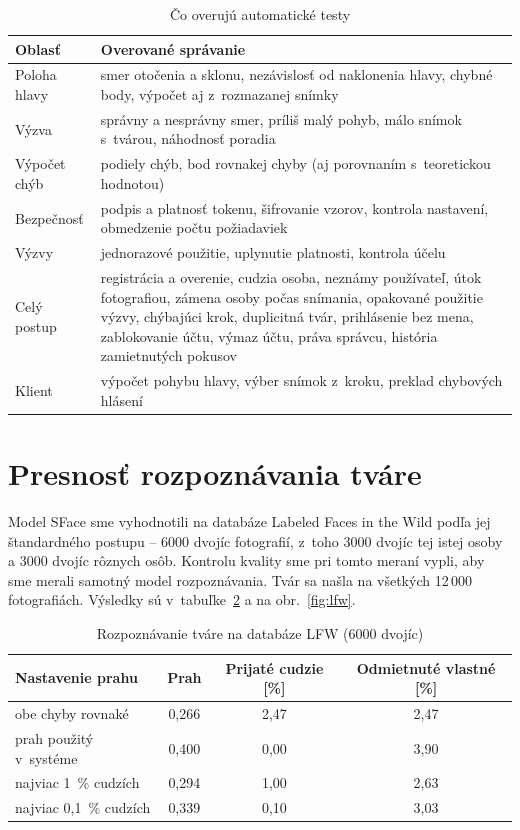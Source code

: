 \documentclass[12pt,a4paper,oneside]{report}
\begin{document}
\begin{table}[H]
  \centering
  \caption{Čo overujú automatické testy}
  \label{tab:testy}
  \small
  \begin{tabularx}{\textwidth}{@{}l X@{}}
    \toprule
    Oblasť & Overované správanie \\
    \midrule
    Poloha hlavy & smer otočenia a sklonu, nezávislosť od naklonenia hlavy, chybné body, výpočet aj z~rozmazanej snímky \\
    Výzva & správny a nesprávny smer, príliš malý pohyb, málo snímok s~tvárou, náhodnosť poradia \\
    Výpočet chýb & podiely chýb, bod rovnakej chyby (aj porovnaním s~teoretickou hodnotou) \\
    Bezpečnosť & podpis a platnosť tokenu, šifrovanie vzorov, kontrola nastavení, obmedzenie počtu požiadaviek \\
    Výzvy & jednorazové použitie, uplynutie platnosti, kontrola účelu \\
    Celý postup & registrácia a overenie, cudzia osoba, neznámy používateľ, útok fotografiou, zámena osoby počas snímania, opakované použitie výzvy, chýbajúci krok, duplicitná tvár, prihlásenie bez mena, zablokovanie účtu, výmaz účtu, práva správcu, história zamietnutých pokusov \\
    Klient & výpočet pohybu hlavy, výber snímok z~kroku, preklad chybových hlásení \\
    \bottomrule
  \end{tabularx}
\end{table}

\section{Presnosť rozpoznávania tváre}

Model SFace sme vyhodnotili na databáze Labeled Faces in the Wild \cite{huang2007lfw}
podľa jej štandardného postupu -- 6000 dvojíc fotografií, z~toho 3000 dvojíc tej istej
osoby a 3000 dvojíc rôznych osôb. Kontrolu kvality sme pri tomto meraní vypli, aby sme
merali samotný model rozpoznávania. Tvár sa našla na všetkých 12\,000 fotografiách.
Výsledky sú v~tabuľke~\ref{tab:lfw} a na obr.~\ref{fig:lfw}.

\begin{table}[H]
  \centering
  \caption{Rozpoznávanie tváre na databáze LFW (6000 dvojíc)}
  \label{tab:lfw}
  \begin{tabularx}{\textwidth}{@{}X c c c@{}}
    \toprule
    Nastavenie prahu & Prah & Prijaté cudzie [\%] & Odmietnuté vlastné [\%] \\
    \midrule
    obe chyby rovnaké & 0,266 & 2,47 & 2,47 \\
    prah použitý v~systéme & 0,400 & 0,00 & 3,90 \\
    najviac 1~\% cudzích & 0,294 & 1,00 & 2,63 \\
    najviac 0,1~\% cudzích & 0,339 & 0,10 & 3,03 \\
    \bottomrule
  \end{tabularx}
\end{table}
\end{document}
